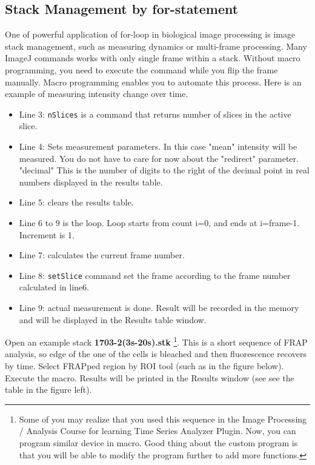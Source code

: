 \documentclass[11pt,a4paper,oneside]{report}
\newcommand{\ilcom}[1]{\texttt{\small#1}}
\begin{document}
\subsection{Stack Management by for-statement}
One of powerful application of for-loop in biological image processing is image stack management, 
such as measuring dynamics or multi-frame processing. 
Many ImageJ commands works with only single frame within a stack. 
Without macro programming, you need to execute the command while you flip the frame manually. 
Macro programming enables you to automate this process. 
Here is an example of measuring intensity change over time. 

\begin{itemize}
\item Line 3: \ilcom{nSlices} is a command that returns number of slices in the active slice. 

\item Line 4: Sets measurement parameters. In this case "mean" intensity will be measured. 
You do not have to care for now about the "redirect" parameter. "decimal" This is the number of digits to 
the right of the decimal point in real numbers displayed in the results table. 

\item Line 5: clears the results table. 

\item Line 6 to 9 is the loop. Loop starts from count i=0, and ends at i=frame-1. Increment is 1.  

\item Line 7: calculates the current frame number. 

\item Line 8: \ilcom{setSlice} command set the frame according to the frame number calculated in line6. 

\item Line 9:  actual measurement is done. 
Result will be recorded in the memory and will be displayed in the Results table window. 
\end{itemize}

Open an example stack \textbf{1703-2(3s-20s).stk}
\footnote{Some of you may realize that you used this sequence 
in the Image Processing / Analysis Course for learning 
Time Series Analyzer Plugin. Now, you can program similar 
device in macro. Good thing about the custom program 
is that you will be able to modify the program further to add more functions.}. 
This is a short sequence of FRAP analysis, 
so edge of the one of the cells is bleached and then fluorescence recovers by time. 
Select FRAPped region by ROI tool (such as in the figure below). 
Execute the macro. Results will be printed in the Results window (see see the table in the figure left). 
\end{document}
